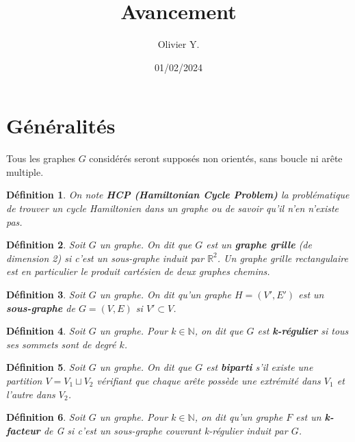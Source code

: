 \documentclass{article}
\title{Avancement}
\author{Olivier Y.}
\date{01/02/2024}
\newtheorem{definition}{Définition}[section]
\begin{document}
\maketitle

\tableofcontents
\newpage






\section{Généralités}

Tous les graphes $G$ considérés seront supposés non orientés, sans boucle ni arête multiple.

\begin{definition}
On note \textbf{HCP (Hamiltonian Cycle Problem)} la problématique de trouver un cycle Hamiltonien dans un graphe ou de savoir qu'il n'en n'existe pas.
\end{definition}


\begin{definition}
Soit $G$ un graphe.
On dit que $G$ est un \textbf{graphe grille} (de dimension 2) si c'est un sous-graphe induit par $\mathbb{R}^{2}$.
Un graphe grille rectangulaire est en particulier le produit cartésien de deux graphes chemins.
\end{definition}

\begin{definition}
Soit $G$ un graphe.
On dit qu'un graphe $H=(V',E')$ est un \textbf{sous-graphe} de $G=(V,E)$ si $V' \subset V$.
\end{definition}

\begin{definition}
Soit $G$ un graphe.
Pour $k \in \mathbb{N}$, on dit que $G$ est \textbf{k-régulier} si tous ses sommets sont de degré $k$.
\end{definition}

\begin{definition}
Soit $G$ un graphe.
On dit que $G$ est \textbf{biparti} s'il existe une partition $V=V_{1} \sqcup V_{2}$ vérifiant que chaque arête possède une extrémité dans $V_{1}$ et l'autre dans $V_{2}$.
\end{definition}

\begin{definition}
Soit $G$ un graphe.
Pour $k \in \mathbb{N}$, on dit qu'un graphe $F$ est un \textbf{k-facteur} de G si c'est un sous-graphe couvrant k-régulier induit par $G$.
\end{definition}
\end{document}
